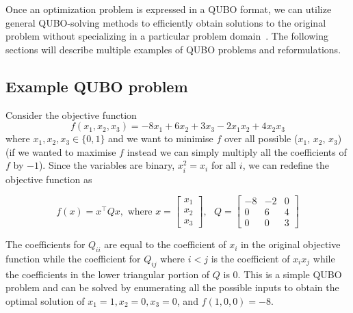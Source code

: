 Once an optimization problem is expressed in a QUBO format, we can utilize general QUBO-solving methods to efficiently obtain solutions to the original problem without specializing in a particular problem domain~\cite{b1}. The following sections will describe multiple examples of QUBO problems and reformulations.

\subsection{Example QUBO problem}\label{subsection:example_qubo}
Consider the objective function \begin{equation}
f(x_1, x_2, x_3) = -8x_1 + 6x_2 + 3x_3 - 2 x_1 x_2 + 4 x_2 x_3
\end{equation} where $x_1, x_2, x_3 \in \{0, 1\}$ and we want to minimise $f$ over all possible ($x_1$, $x_2$, $x_3$) (if we wanted to maximise $f$ instead we can simply multiply all the coefficients of $f$ by $-1$). Since the variables are binary, $x_i^2 = x_i$ for all $i$, we can redefine the objective function as 

\begin{equation}
f(x) = x^\intercal Q x, \text{ where } x = \begin{bmatrix}
x_1 \\
x_2 \\
x_3 
\end{bmatrix}, \text{ }
Q = \begin{bmatrix}
-8 & -2 & 0\\
0 & 6 & 4\\
0 & 0 & 3
\end{bmatrix}
\end{equation}

The coefficients for $Q_{ii}$ are equal to the coefficient of $x_i$ in the original objective function while the coefficient for $Q_{ij}$ where $i < j$ is the coefficient of $x_{i}x_j$ while the coefficients in the lower triangular portion of $Q$ is $0$. This is a simple QUBO problem and can be solved by enumerating all the possible inputs to obtain the optimal solution of $x_1 = 1, x_2 = 0, x_3 = 0$, and $f(1,0,0) = -8$.

